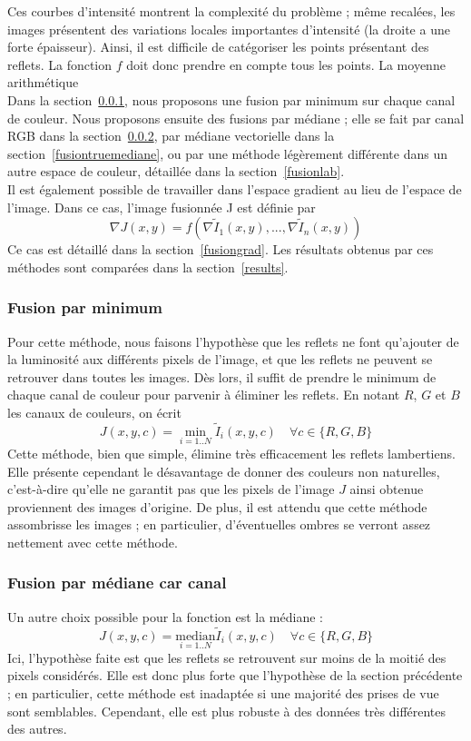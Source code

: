 \documentclass[12pt,a4paper]{article}
\begin{document}
Ces courbes d'intensité montrent la complexité du problème ; même recalées, les images présentent des variations locales importantes d'intensité (la droite a une forte épaisseur). Ainsi, il est difficile de catégoriser les points présentant des reflets. La fonction $f$ doit donc prendre en compte tous les points. La moyenne arithmétique \\
Dans la section~\ref{fusionmin}, nous proposons une fusion par minimum sur chaque canal de couleur. Nous proposons ensuite des fusions par médiane ; elle se fait par canal RGB dans la section~\ref{fusionmediane}, par médiane vectorielle dans la section~\ref{fusiontruemediane}, ou par une méthode légèrement différente dans un autre espace de couleur, détaillée dans la section~\ref{fusionlab}.\\
Il est également possible de travailler dans l'espace gradient au lieu de l'espace de l'image. Dans ce cas, l'image fusionnée J est définie par
\[
\nabla J(x,y)=f\left(\nabla \tilde I_1(x,y), ..., \nabla \tilde I_n(x,y)\right)
\]
Ce cas est détaillé dans la section~\ref{fusiongrad}. Les résultats obtenus par ces méthodes sont comparées dans la section~\ref{results}.
\subsubsection{Fusion par minimum}
\label{fusionmin}
Pour cette méthode, nous faisons l'hypothèse que les reflets ne font qu'ajouter de la luminosité aux différents pixels de l'image, et que les reflets ne peuvent se retrouver dans toutes les images. Dès lors, il suffit de prendre le minimum de chaque canal de couleur pour parvenir à éliminer les reflets. En notant $R$, $G$ et $B$ les canaux de couleurs, on écrit
\[
J(x,y,c)=\min_{i=1..N}\tilde I_i(x,y,c) \quad \forall c \in \{R,G,B\}
\]
Cette méthode, bien que simple, élimine très efficacement les reflets lambertiens. Elle présente cependant le désavantage de donner des couleurs non naturelles, c'est-à-dire qu'elle ne garantit pas que les pixels de l'image $J$ ainsi obtenue proviennent des images d'origine. De plus, il est attendu que cette méthode assombrisse les images ; en particulier, d'éventuelles ombres se verront assez nettement avec cette méthode.
\subsubsection{Fusion par médiane car canal}
\label{fusionmediane}
Un autre choix possible pour la fonction est la médiane :
\[
J(x,y,c)=\underset{i=1..N}{\mathrm{median}}\tilde I_i(x,y,c) \quad \forall c \in \{R,G,B\}
\]
Ici, l'hypothèse faite est que les reflets se retrouvent sur moins de la moitié des pixels considérés. Elle est donc plus forte que l'hypothèse de la section précédente ; en particulier, cette méthode est inadaptée si une majorité des prises de vue sont semblables. Cependant, elle est plus robuste à des données très différentes des autres. 
\end{document}
